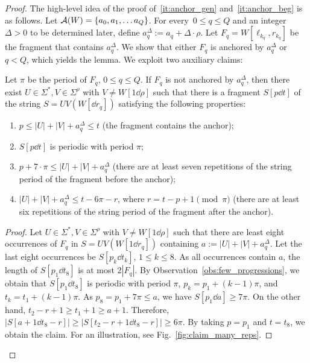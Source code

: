 \begin{proof}
The high-level idea of the proof of~\ref{it:anchor_gen} and~\ref{it:anchor_beg} is as follows. Let $\mathcal{A}(W)= \{a_0,a_1, \ldots a_Q \}$. For every~$0 \le q \le Q$ and an integer $\Delta > 0$ to be determined later, define $a_q^\Delta := a_q +\Delta \cdot \rho$. Let $F_q=W[\ell_{k_q},r_{k_q}]$ be the fragment that contains $a_q^{\Delta}$. We show that either $F_q$ is anchored by $a_q^{\Delta}$ or $q < Q$, which yields the lemma. We exploit two auxiliary claims:

\begin{claim}\label{claim:many_reps}
Let $\pi$ be the period of $F_q$, $0 \le q \le Q$. If $F_q$ is not anchored by $a_q^\Delta$, then there exist $U \in \Sigma^\ast, V \in \Sigma^\rho$ with $V \neq W[1 \dd \rho]$ such that there is a fragment $S[p \dd t]$ of the string $S = UV(W[\dd r_q])$ satisfying the following properties:
\begin{enumerate}
\item $p \le |U|+|V|+a_q^\Delta \le t$ (the fragment contains the anchor);
\item $S[p \dd t]$ is periodic with period $\pi$;
\item $p+7\cdot \pi \le |U|+|V|+a_q^\Delta$ (there are at least seven repetitions of the string period of the fragment before the anchor);
\item $|U|+|V|+a_q^\Delta \le t-6\pi-r$, where $r = t-p+1 \pmod \pi$ (there are at least six repetitions of the string period of the fragment after the anchor). 
\end{enumerate}
\end{claim}
\begin{proof}
Let $U \in \Sigma^\ast, V \in \Sigma^\rho$ with $V \neq W[1 \dd \rho]$ such that there are least eight occurrences of $F_q$ in $S = UV(W[1 \dd r_q])$ containing $a := |U|+|V|+a_q^\Delta$. Let the last eight occurrences be $S[p_k \dd t_k]$, $1 \le k \le 8$. As all occurrences contain $a$, the length of $S[p_1 \dd t_8]$ is at most $2|F_q|$. By Observation~\ref{obs:few_progressions}, we obtain that $S[p_1 \dd t_8]$ is periodic with period $\pi$, $p_k = p_1 + (k-1) \pi$, and $t_k = t_1 + (k-1) \pi$. As $p_8 = p_1+7\pi \le a$,  we have $S[p_1 \dd a] \ge 7 \pi$. On the other hand, $t_2-r+1 \ge t_1+1 \ge a+1$. Therefore, $|S[a+1 \dd t_8-r]| \ge |S[t_2-r+1 \dd t_8-r]| \ge 6\pi$. By taking $p = p_1$ and $t = t_8$, we obtain the claim. For an illustration, see Fig.~\ref{fig:claim_many_reps}.
\end{proof}


\end{proof}
